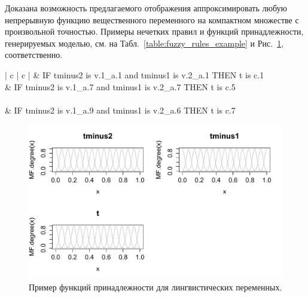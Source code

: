 \documentclass[a4paper,14pt]{article}
\begin{document}
Доказана возможность предлагаемого отображения аппроксимировать любую непрерывную функцию вещественного переменного на компактном множестве с произвольной точностью.
Примеры нечетких правил и функций принадлежности, генерируемых моделью, см. на
Табл.~\ref{table:fuzzy_rules_example} и Рис.~\ref{figure:MFexample}, соответственно.  

\renewcommand{\arraystretch}{1.5} %
\setlength{\tabcolsep}{8pt} %

\begin{table}[bhtp]
	\caption{Пример нечетких правил.}
	\begin{center}
		\begin{tabular}{ | c | c | }
			 & IF tminus2 is  v.1\_a.1 and tminus1 is  v.2\_a.1 THEN   t  is  c.1 \\
			 & IF tminus2 is  v.1\_a.7 and tminus1 is  v.2\_a.7 THEN   t  is  c.5  \\
			\hline
			 \\
			 & IF tminus2 is  v.1\_a.9 and tminus1 is  v.2\_a.6 THEN   t  is  c.7 \\
			\hline
		\end{tabular}		
	\end{center}
	\label{table:fuzzy_rules_example}	
\end{table}

\begin{figure}[bhtp]
	\begin{center}
		\includegraphics[scale=0.8]{images/MFexample.pdf}
		\caption{Пример функций принадлежности для лингвистических переменных.}		
		\label{figure:MFexample}
	\end{center}
\end{figure}
\end{document}
